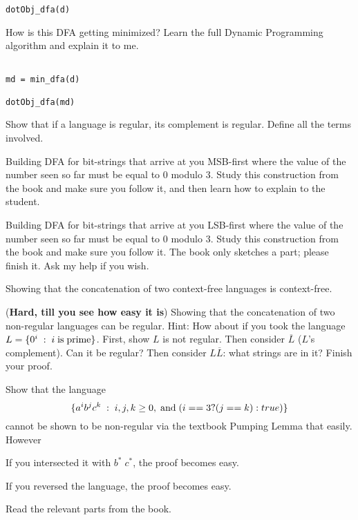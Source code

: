 \documentclass[12pt]{article}
\begin{document}
\begin{compactenum}
\begin{verbatim}
dotObj_dfa(d)

 \end{verbatim}


\item How is this DFA getting minimized? Learn the full Dynamic Programming algorithm and
explain it to me.
%
\begin{verbatim}

md = min_dfa(d)

dotObj_dfa(md)

 \end{verbatim}

\item Show that if a language is regular, its complement is regular.
Define all the terms involved.

\item Building DFA for bit-strings that arrive at you MSB-first
  where the value of the number seen so far must be equal to $0$
  modulo $3$. Study this construction from the book and make sure you follow it,
  and then  learn how to explain to the student.

\item Building DFA for bit-strings that arrive at you LSB-first
  where the value of the number seen so far must be equal to $0$
  modulo $3$.  Study this construction from the book and make sure you follow it.
  The book only sketches a part; please finish it. Ask my help if you wish.

\item Showing that the concatenation of two context-free
  languages is context-free.

\item ({\bf Hard, till you see how easy it is}) Showing that
  the concatenation of two non-regular languages can be regular.
 Hint: How about if you took the language $L = \{0^i \;:\; i\; {\rm is}\; {\rm prime}\}$.
 First, show $L$ is not regular. Then consider $\overline{L}$ ($L$'s complement). Can it be regular?
 Then consider $L\overline{L}$: what strings are in it? Finish your proof.
  
\item Show that the language
  \[ \{ a^i b^j c^k \;:\; i,j,k\ge 0,\; {\rm and}\; (i==3?(j==k):true) \}\]
  cannot be shown to be non-regular via the textbook Pumping Lemma
  that easily. However
  \begin{compactitem}
  \item If you intersected it with $b^*\; c^*$, the proof becomes
    easy.
  \item If you reversed the language, the proof becomes easy.
  \end{compactitem}
  Read the relevant parts from the book.


\end{compactenum}
\end{document}
